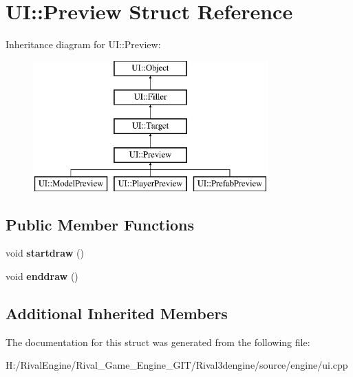 \hypertarget{struct_u_i_1_1_preview}{}\section{UI\+:\+:Preview Struct Reference}
\label{struct_u_i_1_1_preview}
Inheritance diagram for UI\+:\+:Preview\+:\begin{figure}[H]
\begin{center}
\leavevmode
\includegraphics[height=5.000000cm]{struct_u_i_1_1_preview}
\end{center}
\end{figure}
\subsection*{Public Member Functions}
\begin{DoxyCompactItemize}
\item 
\mbox{\label{struct_u_i_1_1_preview_aede1e6e2c7ca0d07c362b8eb08f5e29b}} 
void {\bfseries startdraw} ()
\item 
\mbox{\label{struct_u_i_1_1_preview_a43b394b43e6eb51ecb613d0f353e9b13}} 
void {\bfseries enddraw} ()
\end{DoxyCompactItemize}
\subsection*{Additional Inherited Members}


The documentation for this struct was generated from the following file\+:\begin{DoxyCompactItemize}
\item 
H\+:/\+Rival\+Engine/\+Rival\+\_\+\+Game\+\_\+\+Engine\+\_\+\+G\+I\+T/\+Rival3dengine/source/engine/ui.\+cpp\end{DoxyCompactItemize}

